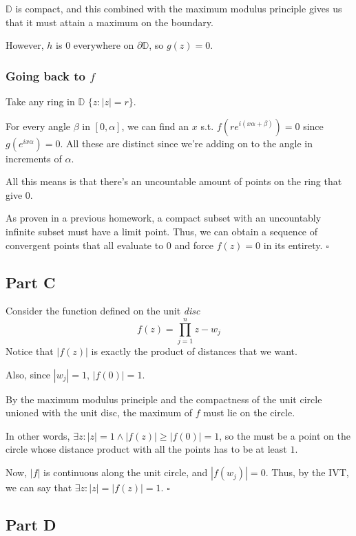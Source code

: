 \documentclass[12pt]{article}
\begin{document}
$\mathbb{D}$ is compact, and this combined with the maximum modulus principle
gives us that it must attain a maximum on the boundary.

However, $h$ is $0$ everywhere on $\partial \mathbb{D}$, so $g(z)=0$.

\subsubsection{Going back to \texorpdfstring{$f$}{f}}

Take any ring in $\mathbb{D}$ $\{z: |z|=r\}$.

For every angle $\beta$ in $\left[0, \alpha\right]$,
we can find an $x$ s.t. $f\left(re^{i(x\alpha + \beta)}\right)=0$ since $g\left(e^{ix\alpha}\right)=0$.
All these are distinct since we're adding on to the angle in increments of $\alpha$.

All this means is that there's an uncountable amount of points on the ring that give $0$.

As proven in a previous homework, a compact subset with an uncountably infinite
subset must have a limit point.
Thus, we can obtain a sequence of convergent points
that all evaluate to $0$ and force $f(z)=0$ in its entirety. $\square$

\pagebreak

\subsection{Part C}

Consider the function defined on the unit \textit{disc}
\[f(z)=\prod_{j=1}^{n} z-w_j\]
Notice that $|f(z)|$ is exactly the product of distances that we want.

Also, since $|w_j|=1$, $|f(0)|=1$.

By the maximum modulus principle and the compactness of the unit circle
unioned with the unit disc, the maximum of $f$ must lie on the circle.

In other words, $\exists z: |z|=1 \land |f(z)| \ge |f(0)|=1$, so the must be a point
on the circle whose distance product with all the points has to be at least $1$.

Now, $|f|$ is continuous along the unit circle, and $|f(w_j)|=0$.
Thus, by the IVT, we can say that $\exists z: |z|=|f(z)|=1$. $\square$

\subsection{Part D}
\end{document}
